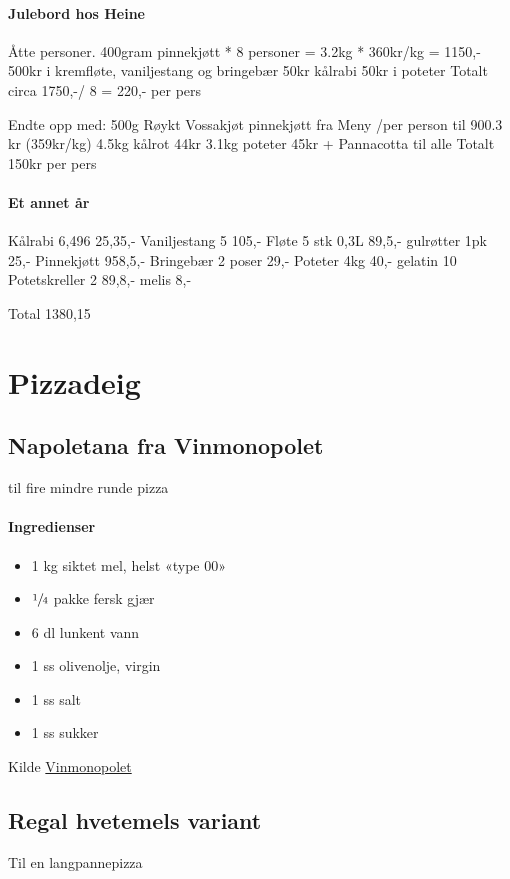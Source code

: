\documentclass[12pt,a4paper]{book}
\begin{document}
\paragraph{Julebord hos Heine}
Åtte personer.
400gram pinnekjøtt * 8 personer = 3.2kg * 360kr/kg = 1150,-
500kr i kremfløte, vaniljestang og bringebær
50kr kålrabi
50kr i poteter
Totalt circa 1750,-/ 8 = 220,- per pers


Endte opp med:
500g Røykt Vossakjøt pinnekjøtt fra Meny /per person til 900.3 kr (359kr/kg)
4.5kg kålrot 44kr
3.1kg poteter 45kr
+ Pannacotta til alle
Totalt 150kr per pers


\paragraph{Et annet år}

Kålrabi 6,496 25,35,-
Vaniljestang 5 105,-
Fløte 5 stk 0,3L 89,5,-
gulrøtter 1pk 25,-
Pinnekjøtt 958,5,-
Bringebær 2 poser 29,-
Poteter 4kg 40,-
gelatin 10
Potetskreller 2 89,8,-
melis 8,-


Total
1380,15
\clearpage{}
\clearpage{}\section{﻿Pizzadeig}

\subsection{Napoletana fra Vinmonopolet}
til fire mindre runde pizza
\paragraph{Ingredienser}
\begin{itemize}[noitemsep]
	\item 1 kg siktet mel, helst «type 00»
	\item $\sfrac{1}{4}$  pakke fersk gjær
	\item 6 dl lunkent vann
	\item 1 ss olivenolje, virgin
	\item 1 ss salt
	\item 1 ss sukker
\end{itemize}


Kilde \href{http://www.vinmonopolet.no/artikkel/mat-og-drikke/kombinasjoner-med-mat/pizza/drikke-til-pizza}{Vinmonopolet}


\subsection{Regal hvetemels variant}
Til en langpannepizza
\end{document}
